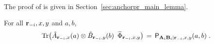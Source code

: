 The proof of  is given in Section~\ref{sec:anchorpr_main_lemma}. 

\begin{claim}\label{claim:main-1}
For all $\mathbf{r}_{-i}, x,y$ and $a,b$,
\begin{equation}\label{eq:anchorpr_main-2}
\mbox{\rm Tr} \big ( \hat{A}_{\mathbf{r}_{-i}, x}(a) \otimes \hat{B}_{\mathbf{r}_{-i}, y}(b) \,\,\,\widetilde{\Phi}_{{\mathbf{r}_{-i} , x,y}} \big )  \,=\,\mathsf{P}_{\mathbf{A}_i \mathbf{B}_i | \mathbf{r}_{-i},x,y}(a,b)\;.
\end{equation}
\end{claim}


